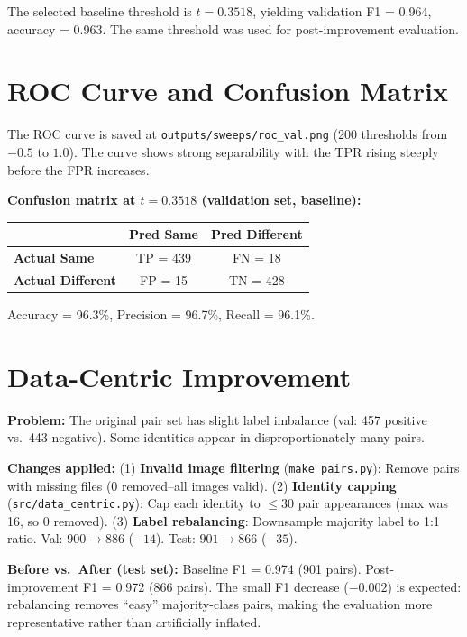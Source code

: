 \documentclass[11pt,a4paper]{article}
\begin{document}
The selected baseline threshold is $t = 0.3518$, yielding validation
F1 = 0.964, accuracy = 0.963. The same threshold was used for post-improvement evaluation.

\section{ROC Curve and Confusion Matrix}

The ROC curve is saved at \texttt{outputs/sweeps/roc\_val.png} (200 thresholds from $-0.5$ to $1.0$).
The curve shows strong separability with the TPR rising steeply before the FPR increases.

\medskip

\noindent\textbf{Confusion matrix at $t=0.3518$ (validation set, baseline):}

\begin{table}[h]
\centering
\begin{tabular}{@{}lcc@{}}
\toprule
 & \textbf{Pred Same} & \textbf{Pred Different} \\
\midrule
\textbf{Actual Same}      & TP = 439 & FN = 18 \\
\textbf{Actual Different}  & FP = 15  & TN = 428 \\
\bottomrule
\end{tabular}
\end{table}

Accuracy = 96.3\%, Precision = 96.7\%, Recall = 96.1\%.

\section{Data-Centric Improvement}

\textbf{Problem:} The original pair set has slight label imbalance (val: 457 positive vs.\ 443 negative).
Some identities appear in disproportionately many pairs.

\textbf{Changes applied:}
(1) \textbf{Invalid image filtering} (\texttt{make\_pairs.py}): Remove pairs with missing files (0 removed--all images valid).
(2) \textbf{Identity capping} (\texttt{src/data\_centric.py}): Cap each identity to $\leq$30 pair appearances (max was 16, so 0 removed).
(3) \textbf{Label rebalancing}: Downsample majority label to 1:1 ratio.
Val: $900 \to 886$ ($-14$). Test: $901 \to 866$ ($-35$).

\textbf{Before vs.\ After (test set):}
Baseline F1 = 0.974 (901 pairs). Post-improvement F1 = 0.972 (866 pairs).
The small F1 decrease ($-0.002$) is expected: rebalancing removes ``easy'' majority-class pairs,
making the evaluation more representative rather than artificially inflated.
\end{document}
